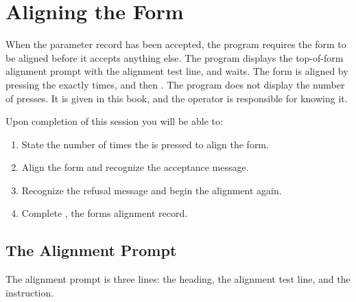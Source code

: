 \chapter{Aligning the Form}

When the parameter record has been accepted, the
program requires the form to be aligned before it accepts anything else.
The program displays the top-of-form alignment prompt with the alignment
test line, and waits.  The form is aligned by pressing the 
exactly  times, and then .  The program
does not display the number of presses.  It is given in this book, and the
operator is responsible for knowing it.

Upon completion of this session you will be able to:
\begin{enumerate}
\item State the number of times the  is pressed to align the
  form.
\item Align the form and recognize the acceptance message.
\item Recognize the refusal message and begin the alignment again.
\item Complete , the forms alignment record.
\end{enumerate}

\section{The Alignment Prompt}
The alignment prompt is three lines: the heading, the alignment test line,
and the instruction.

